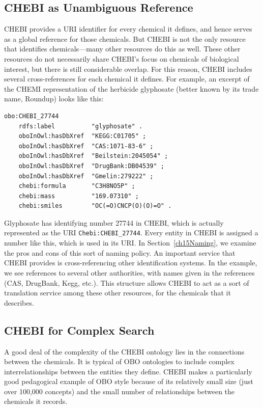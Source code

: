 \subsection{CHEBI as Unambiguous Reference}

CHEBI provides a URI identifier for every chemical it defines, and hence
serves as a global reference for those chemicals. But CHEBI is not the
only resource that identifies chemicals---many other
resources do this as well. These other resources do not necessarily
share CHEBI's focus on chemicals of biological interest, but there is
still considerable overlap. For this reason, CHEBI includes several
cross-references for each chemical it defines. For example, an excerpt of the 
CHEMI representation of the
herbicide glyphosate (better known by its trade name, Roundup) looks like this: 

\begin{lstlisting}
obo:CHEBI_27744  
    rdfs:label          "glyphosate" .
    oboInOwl:hasDbXref  "KEGG:C01705" ;
    oboInOwl:hasDbXref  "CAS:1071-83-6" ;
    oboInOwl:hasDbXref  "Beilstein:2045054" ;
    oboInOwl:hasDbXref  "DrugBank:DB04539" ;
    oboInOwl:hasDbXref  "Gmelin:279222" ;
    chebi:formula       "C3H8NO5P" ;
    chebi:mass          "169.07310" ;
    chebi:smiles        "OC(=O)CNCP(O)(O)=O" .
\end{lstlisting}

Glyphosate has identifying number 27744 in CHEBI, which is actually
represented as the URI \texttt{Chebi:CHEBI\_27744}. Every entity in CHEBI is
assigned a number like this, which is used in its URI.  In Section~\ref{ch15Naming}, we
examine the pros and cons of this sort of naming policy. 
An important service that CHEBI provides is cross-referencing other identification
systems.  
In the example, we see references to several other
authorities, with names given in the references (CAS, DrugBank, Kegg,
etc.). This structure allows CHEBI to act as a sort of
translation service among these other resources, for the chemicals that
it describes.


\subsection{CHEBI for Complex Search}

A good deal of the complexity of the CHEBI ontology lies in the
connections between the chemicals. It is typical of OBO ontologies to
include complex interrelationships between the entities they define.
CHEBI makes a particularly good pedagogical example of OBO style because
of its relatively small size (just over 100,000 concepts) and the small number
of relationships between the chemicals it records.

